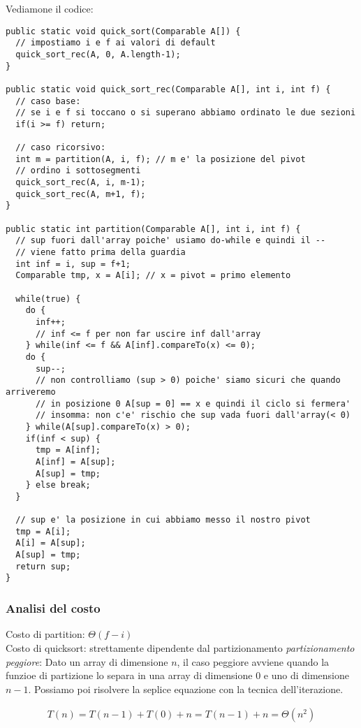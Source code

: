 \documentclass{article}
\begin{document}
Vediamone il codice:
\begin{lstlisting}
public static void quick_sort(Comparable A[]) {
  // impostiamo i e f ai valori di default
  quick_sort_rec(A, 0, A.length-1);
}

public static void quick_sort_rec(Comparable A[], int i, int f) {
  // caso base:
  // se i e f si toccano o si superano abbiamo ordinato le due sezioni
  if(i >= f) return;

  // caso ricorsivo:
  int m = partition(A, i, f); // m e' la posizione del pivot
  // ordino i sottosegmenti
  quick_sort_rec(A, i, m-1);
  quick_sort_rec(A, m+1, f);
}

public static int partition(Comparable A[], int i, int f) {
  // sup fuori dall'array poiche' usiamo do-while e quindi il --
  // viene fatto prima della guardia
  int inf = i, sup = f+1; 
  Comparable tmp, x = A[i]; // x = pivot = primo elemento

  while(true) {
    do {
      inf++;
      // inf <= f per non far uscire inf dall'array
    } while(inf <= f && A[inf].compareTo(x) <= 0);
    do {
      sup--;
      // non controlliamo (sup > 0) poiche' siamo sicuri che quando arriveremo
      // in posizione 0 A[sup = 0] == x e quindi il ciclo si fermera'
      // insomma: non c'e' rischio che sup vada fuori dall'array(< 0)
    } while(A[sup].compareTo(x) > 0);
    if(inf < sup) {
      tmp = A[inf];
      A[inf] = A[sup];
      A[sup] = tmp;
    } else break;
  }

  // sup e' la posizione in cui abbiamo messo il nostro pivot
  tmp = A[i];
  A[i] = A[sup];
  A[sup] = tmp;
  return sup;
}
\end{lstlisting}

\subsubsection{Analisi del costo}

Costo di partition: $\Theta(f-i)$ \\
Costo di quicksort: strettamente dipendente dal partizionamento
\emph{partizionamento peggiore}:
Dato un array di dimensione $n$, il caso peggiore avviene quando la funzioe di
partizione lo separa in una array di dimensione $0$ e uno di dimensione $n-1$.
Possiamo poi risolvere la seplice equazione con la tecnica dell'iterazione.

\begin{align*}
  T(n) = T(n-1) + T(0) + n = T(n-1) + n = \Theta(n^2)
\end{align*}
\end{document}
